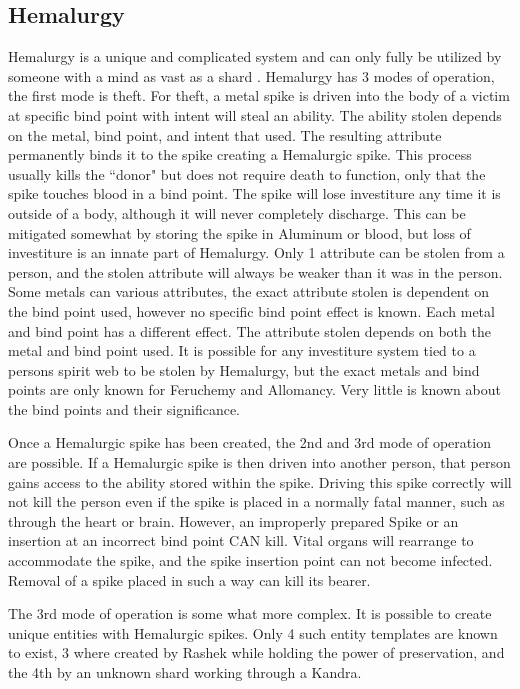\documentclass[conference]{IEEEtran}
\begin{document}
\subsection*{Hemalurgy}
Hemalurgy is a unique and complicated system and can only fully be utilized by someone with a mind as vast as a shard \cite{WoF}.  Hemalurgy has 3 modes of operation, the first mode is theft.  For theft, a metal spike is driven into the body of a victim at specific bind point with intent will steal an ability.  The ability stolen depends on the metal, bind point, and intent that used.  The resulting attribute permanently binds it to the spike creating a Hemalurgic spike.  This process usually kills the ``donor" but does not require death to function, only that the spike touches blood in a bind point.  The spike will lose investiture any time it is outside of a body, although it will never completely discharge.  This can be mitigated somewhat by storing the spike in Aluminum or blood, but loss of investiture is an innate part of Hemalurgy.  Only 1 attribute can be stolen from a person, and the stolen attribute will always be weaker than it was in the person.  Some metals can various attributes, the exact attribute stolen is dependent on the bind point used, however no specific bind point effect is known.
Each metal and bind point has a different effect.  The attribute stolen depends on both the metal and bind point used.  It is possible for any investiture system tied to a persons spirit web to be stolen by Hemalurgy, but the exact metals and bind points are only known for Feruchemy and Allomancy.  Very little is known about the bind points and their significance.

Once a Hemalurgic spike has been created, the 2nd and 3rd mode of operation are possible.  If a Hemalurgic spike is then driven into another person, that person gains access to the ability stored within the spike.  Driving this spike correctly will not kill the person even if the spike is placed in a normally fatal manner, such as through the heart or brain.  However, an improperly prepared Spike or an insertion at an incorrect bind point CAN kill.  Vital organs will rearrange to accommodate the spike, and the spike insertion point can not become infected.  Removal of a spike placed in such a way can kill its bearer.  

The 3rd mode of operation is some what more complex.  It is possible to create unique entities with Hemalurgic spikes.  Only 4 such entity templates are known to exist, 3 where created by Rashek while holding the power of preservation, and the 4th by an unknown shard working through a Kandra. 
\end{document}

